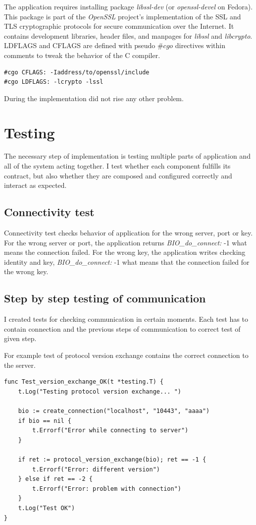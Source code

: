 \documentclass[
  twoside, 12pt, 
  printed, %
  notable,   %
  lof,     %
  lot,     %
]{fithesis3}
\begin{document}
The application requires installing package 
\textit{libssl-dev}  (or \textit{openssl-devel} on Fedora). This package is part of the 
\textit{OpenSSL} project's implementation of the SSL and TLS cryptographic protocols for secure 
communication over the Internet. It contains development libraries, header files, and manpages for 
\textit{libssl} and \textit{libcrypto}. LDFLAGS and CFLAGS are defined with pseudo $\#cgo$ 
directives within comments to tweak the behavior of the C compiler. 
\begin{lstlisting}
#cgo CFLAGS: -Iaddress/to/openssl/include
#cgo LDFLAGS: -lcrypto -lssl
\end{lstlisting}

During the implementation did not rise any other problem.

\section{Testing}

The necessary step of implementation is testing multiple parts of application and all of the 
system acting together. I test whether each component fulfills its contract, but also whether they 
are composed and configured correctly and interact as expected. 

\subsection{Connectivity test}

Connectivity test checks behavior of application for the wrong server, port or key. For the wrong 
server or port, the application returns \textit{BIO\_do\_connect:} -1 what means the connection 
failed. For the wrong key, the application writes checking identity and key, 
\textit{BIO\_do\_connect:} -1 what means that the connection failed for the wrong key.

\subsection{Step by step testing of communication}

I created tests for checking communication in certain moments. Each test has to contain connection 
and the previous steps of communication to correct test of given step.

For example test of protocol version exchange contains the correct connection to the server.
\begin{lstlisting}
func Test_version_exchange_OK(t *testing.T) {
	t.Log("Testing protocol version exchange... ")
		
	bio := create_connection("localhost", "10443", "aaaa")
	if bio == nil {
		t.Errorf("Error while connecting to server")
	}
	
	if ret := protocol_version_exchange(bio); ret == -1 {
		t.Errorf("Error: different version")
	} else if ret == -2 {
		t.Errorf("Error: problem with connection")
	} 
	t.Log("Test OK")
}
\end{lstlisting}
\end{document}
